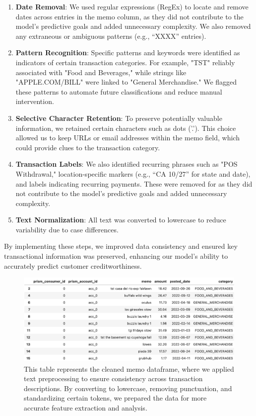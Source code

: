 \documentclass[12pt,letterpaper]{article}
\begin{document}
\begin{enumerate}
    \item \textbf{Date Removal}: We used regular expressions (RegEx) to locate and remove dates across entries in the memo column, as they did not contribute to the model's predictive goals and added unnecessary complexity. We also removed any extraneous or ambiguous patterns (e.g., “XXXX” entries).

    \item \textbf{Pattern Recognition}: Specific patterns and keywords were identified as indicators of certain transaction categories. For example, "TST" reliably associated with "Food and Beverages," while strings like "APPLE.COM/BILL" were linked to "General Merchandise." We flagged these patterns to automate future classifications and reduce manual intervention.

    \item \textbf{Selective Character Retention}: To preserve potentially valuable information, we retained certain characters such as dots ('.'). This choice allowed us to keep URLs or email addresses within the memo field, which could provide clues to the transaction category.

    \item \textbf{Transaction Labels}: We also identified recurring phrases such as "POS Withdrawal," location-specific markers (e.g., “CA 10/27” for state and date), and labels indicating recurring payments. These were removed for as they did not contribute to the model's predictive goals and added unnecessary complexity.

    \item \textbf{Text Normalization}: All text was converted to lowercase to reduce variability due to case differences.
\end{enumerate}

By implementing these steps, we improved data consistency and ensured key transactional information was preserved, enhancing our model's ability to accurately predict customer creditworthiness.

\begin{figure}[H]
    \centering
    \includegraphics[width=\textwidth]{figure/clean_df.jpeg}
    \caption{This table represents the cleaned memo dataframe, where we applied text preprocessing to ensure consistency across transaction descriptions. By converting to lowercase, removing punctuation, and standardizing certain tokens, we prepared the data for more accurate feature extraction and analysis.}
    \label{fig:clean_memo}
\end{figure}
\end{document}
